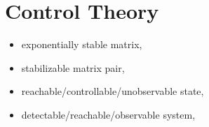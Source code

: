 \chapter{Control Theory}

\begin{itemize}
  \item
    exponentially stable matrix,
  \item
    stabilizable matrix pair,
  \item
    reachable/controllable/unobservable state,
  \item
    detectable/reachable/observable system,
    \etc
\end{itemize}
